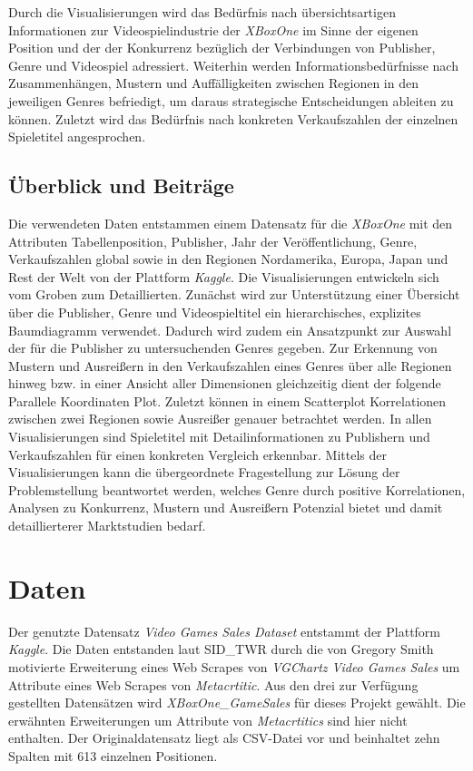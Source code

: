 \documentclass[usegeometry=true]{scrartcl}
\begin{document}
Durch die Visualisierungen wird das Bedürfnis nach übersichtsartigen Informationen zur Videospielindustrie der \textit{XBoxOne}
im Sinne der eigenen Position und der der Konkurrenz bezüglich der Verbindungen von Publisher, Genre und Videospiel adressiert.
Weiterhin werden Informationsbedürfnisse nach Zusammenhängen, Mustern und Auffälligkeiten zwischen Regionen in den jeweiligen Genres befriedigt, 
um daraus strategische Entscheidungen ableiten zu können.
Zuletzt wird das Bedürfnis nach konkreten Verkaufszahlen der einzelnen Spieletitel angesprochen.

\subsection{Überblick und Beiträge}
Die verwendeten Daten entstammen einem Datensatz für die \textit{XBoxOne} mit den Attributen 
Tabellenposition, Publisher, Jahr der Veröffentlichung, Genre, Verkaufszahlen global sowie in den Regionen Nordamerika, Europa, Japan und Rest der Welt von der Plattform \textit{Kaggle}.\cite{SID_TWR.} 
Die Visualisierungen entwickeln sich vom Groben zum Detaillierten.
Zunächst wird zur Unterstützung einer Übersicht über die Publisher, Genre und Videospieltitel ein hierarchisches, explizites Baumdiagramm verwendet. 
Dadurch wird zudem ein Ansatzpunkt zur Auswahl der für die Publisher zu untersuchenden Genres gegeben.
Zur Erkennung von Mustern und Ausreißern in den Verkaufszahlen eines Genres über alle Regionen hinweg bzw. in einer Ansicht aller Dimensionen gleichzeitig 
dient der folgende Parallele Koordinaten Plot.
Zuletzt können in einem Scatterplot Korrelationen zwischen zwei Regionen sowie Ausreißer genauer betrachtet werden.
In allen Visualisierungen sind Spieletitel mit Detailinformationen zu Publishern und Verkaufszahlen für einen konkreten Vergleich erkennbar.
Mittels der Visualisierungen kann die übergeordnete Fragestellung zur Lösung der Problemstellung beantwortet werden, 
welches Genre durch positive Korrelationen, Analysen zu Konkurrenz, Mustern und Ausreißern Potenzial bietet und damit detaillierterer Marktstudien bedarf.

\section{Daten}
Der genutzte Datensatz \textit{Video Games Sales Dataset} entstammt der Plattform \textit{Kaggle}.\cite{SID_TWR.} 
Die Daten entstanden laut SID\_TWR durch die von Gregory Smith motivierte Erweiterung eines Web Scrapes von \textit{VGChartz Video Games Sales}  
um Attribute eines Web Scrapes von \textit{Metacrtitic}.
Aus den drei zur Verfügung gestellten Datensätzen wird \textit{XBoxOne\_GameSales} für dieses Projekt gewählt. 
Die erwähnten Erweiterungen um Attribute von \textit{Metacrtitics} sind hier nicht enthalten. 
Der Originaldatensatz liegt als CSV-Datei vor und beinhaltet zehn Spalten mit 613 einzelnen Positionen. 
\end{document}
